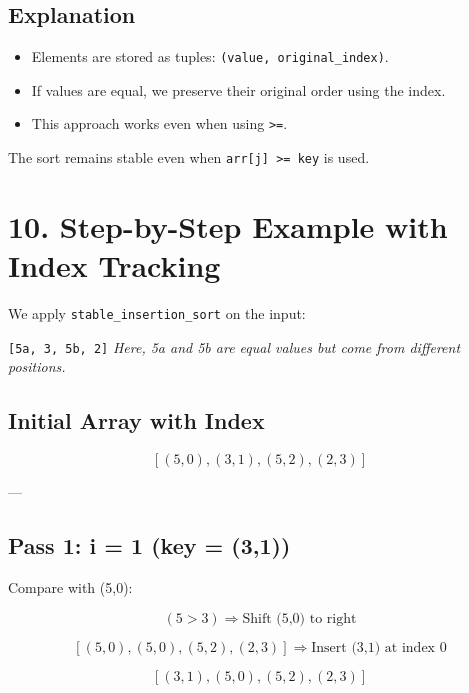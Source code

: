\documentclass[14pt]{extarticle}
\begin{document}
\vspace{0.5em}

\subsection*{Explanation}

\begin{itemize}
    \item Elements are stored as tuples: \texttt{(value, original\_index)}.
    \item If values are equal, we preserve their original order using the index.
    \item This approach works even when using \texttt{>=}.
\end{itemize}

\begin{tcolorbox}[colback=white, colframe=black, title=Result]
The sort remains stable even when \texttt{arr[j] >= key} is used.
\end{tcolorbox}

\section*{10. Step-by-Step Example with Index Tracking}

We apply \texttt{stable\_insertion\_sort} on the input:

\begin{tcolorbox}[colback=white, colframe=black, title=Input]
\texttt{[5a, 3, 5b, 2]}  
\textit{Here, 5a and 5b are equal values but come from different positions.}
\end{tcolorbox}

\subsection*{Initial Array with Index}
\[
[(5,0), (3,1), (5,2), (2,3)]
\]

---

\subsection*{Pass 1: i = 1 (key = (3,1))}

Compare with (5,0):

\[
(5 > 3) \Rightarrow \text{Shift (5,0) to right}
\]

\[
[(5,0), (5,0), (5,2), (2,3)] \Rightarrow \text{Insert (3,1) at index 0}
\]

\[
[(3,1), (5,0), (5,2), (2,3)]
\]
\end{document}
